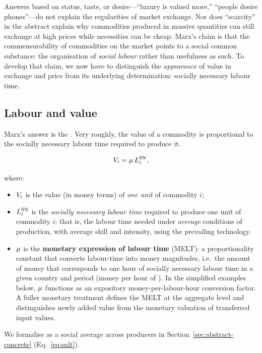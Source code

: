 Answers based on status, taste, or desire---``luxury is valued more,'' ``people desire phones''---do
not explain the regularities of market exchange. Nor does ``scarcity'' in the abstract explain why commodities produced
in massive quantities can still exchange at high prices while necessities can be cheap. Marx’s claim is that the
commensurability of commodities on the market points to a social common substance: the organisation
of \emph{social labour} rather than usefulness as such. To develop that claim, we now have to distinguish the \emph{appearance} of value in exchange
and price from its underlying determination: socially necessary labour time.


\subsection{Labour and value}
\label{sec:labour-and-value}

Marx's answer is the \LTV. Very roughly, the value of a commodity is proportional to the socially necessary labour
time required to produce it.

\begin{equation}
  V_{i} = \mu\,L^{\mathrm{SN}}_{i},
\end{equation}

where:
\begin{itemize}
  \item $V_{i}$ is the value (in money terms) of \emph{one unit} of commodity $i$;
  \item $L^{\mathrm{SN}}_{i}$ is the \emph{socially necessary labour time} required
        to produce one unit of commodity $i$: that is, the labour time needed
        under \emph{average} conditions of production, with average skill and
        intensity, using the prevailing technology.
\item $\mu$ is the \textbf{monetary expression of labour time} (MELT): a proportionality
      constant that converts labour-time into money magnitudes, i.e.\ the amount of money
      that corresponds to one hour of socially necessary labour time in a given country
      and period (money per hour of \snlt). In the simplified examples below, \(\mu\) functions as an expository money-per-labour-hour conversion factor. A fuller monetary treatment defines the MELT at the aggregate level and distinguishes newly added value from the monetary valuation of transferred input values.
\end{itemize}

We formalise \snlt{} as a social average across producers in Section~\ref{sec:abstract-concrete} (Eq.~\eqref{eq:snlt}).


